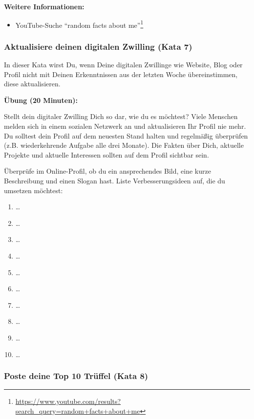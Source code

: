 \documentclass[
  ngerman,
  paper=a4,
,captions=tableheading
]{scrartcl}
\DeclareRobustCommand{\href}[2]{#2\footnote{\url{#1}}}
\providecommand{\tightlist}{%
  \setlength{\itemsep}{0pt}\setlength{\parskip}{0pt}}
\begin{document}
\textbf{Weitere Informationen:}

\begin{itemize}
\tightlist
\item
  YouTube-Suche
  \href{https://www.youtube.com/results?search_query=random+facts+about+me}{``random
  facts about me''}
\end{itemize}

\hypertarget{aktualisiere-deinen-digitalen-zwilling-kata-7}{%
\subsubsection{Aktualisiere deinen digitalen Zwilling (Kata
7)}\label{aktualisiere-deinen-digitalen-zwilling-kata-7}}

In dieser Kata wirst Du, wenn Deine digitalen Zwillinge wie Website,
Blog oder Profil nicht mit Deinen Erkenntnissen aus der letzten Woche
übereinstimmen, diese aktualisieren.

\textbf{Übung (20 Minuten):}

Stellt dein digitaler Zwilling Dich so dar, wie du es möchtest? Viele
Menschen melden sich in einem sozialen Netzwerk an und aktualisieren Ihr
Profil nie mehr. Du solltest dein Profil auf dem neuesten Stand halten
und regelmäßig überprüfen (z.B. wiederkehrende Aufgabe alle drei
Monate). Die Fakten über Dich, aktuelle Projekte und aktuelle Interessen
sollten auf dem Profil sichtbar sein.

Überprüfe im Online-Profil, ob du ein ansprechendes Bild, eine kurze
Beschreibung und einen Slogan hast. Liste Verbesserungsideen auf, die du
umsetzen möchtest:

\begin{enumerate}
\def\labelenumi{\arabic{enumi}.}
\tightlist
\item
  \ldots{}
\item
  \ldots{}
\item
  \ldots{}
\item
  \ldots{}
\item
  \ldots{}
\item
  \ldots{}
\item
  \ldots{}
\item
  \ldots{}
\item
  \ldots{}
\item
  \ldots{}
\end{enumerate}

\hypertarget{poste-deine-top-10-truxfcffel-kata-8}{%
\subsubsection{Poste deine Top 10 Trüffel (Kata
8)}\label{poste-deine-top-10-truxfcffel-kata-8}}
\end{document}

